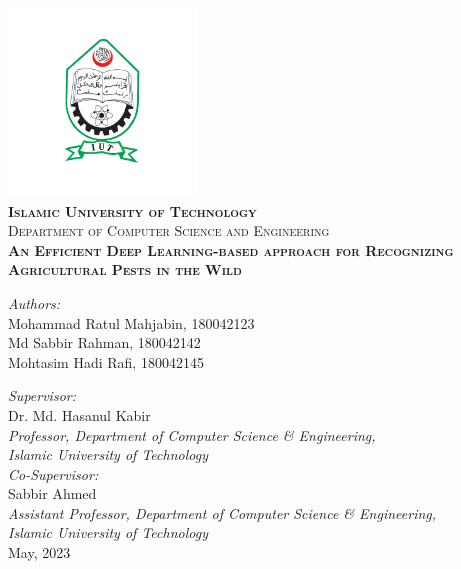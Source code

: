 \begin{titlepage}
\newcommand{\HRule}{\rule{\linewidth}{0.5mm}}
\begin{center}
\includegraphics[width = 5cm]{./figures/iut_logo}\\
\textbf{\textsc{\Large Islamic University of Technology}}\\
\textsc{\large Department of Computer Science and Engineering}\\[1.2cm]

\textbf{\textsc{\Large An Efficient Deep Learning-based approach for Recognizing Agricultural Pests in the Wild}}\\[3cm]
\end{center}

\begin{center}
\large
\textit{Authors:}\\
Mohammad Ratul Mahjabin, 180042123\\
Md Sabbir Rahman, 180042142\\
Mohtasim Hadi Rafi, 180042145\\[2cm]
\makeatletter

\textit{Supervisor:}\\
Dr. Md. Hasanul Kabir\\
\footnotesize
\textit{Professor, 
Department of Computer Science \& Engineering,\\
Islamic University of Technology\\[1cm]}
\normalsize
\textit{Co-Supervisor:}\\
\large
Sabbir Ahmed\\
\footnotesize
\textit{Assistant Professor, 
Department of Computer Science \& Engineering,\\
Islamic University of Technology\\[1cm]}
May, 2023
\end{center}
\makeatletter

\end{titlepage}